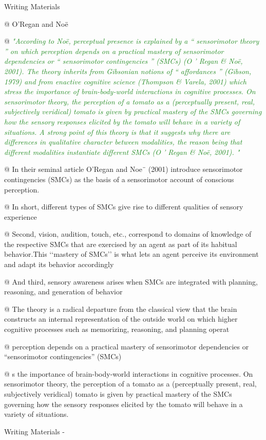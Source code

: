 \documentclass[utf8]{article}
\newenvironment{WritingMaterials} %
    	{
            \begin{tcolorbox}[enhanced,
                title=-,
                size=small,
                colbacktitle=Aquamarine,
                drop fuzzy shadow,
                fontupper=\small,
                boxrule=0.4pt,
                colback=Aquamarine!10!white,
                sharp corners]
                Writing Materials
            \end{tcolorbox}
            \begin{easylist}[itemize]
    	}
    	{
            \end{easylist}  
            \begin{tcolorbox}[enhanced,
                halign=flush right,
                halign title=right,
                size=small,
                colbacktitle=Aquamarine,
                drop fuzzy shadow,
                fontupper=\small,
                boxrule=0.4pt,
                colback=Aquamarine,
                colupper=White,
                sharp corners]
                Writing Materials -
            \end{tcolorbox}        
    	}
\newcommand{\rewrite}[1]{\textcolor{ForestGreen}{\textit{"#1"}}\newline}
\begin{document}
			\begin{WritingMaterials} %

				@ O’Regan and Noë


				@ \rewrite{According to Noë, perceptual presence is explained by a “ sensorimotor theory ” on which perception depends on a practical mastery of sensorimotor dependencies or “ sensorimotor contingencies ” (SMCs) (O ’ Regan & Noë, 2001). The theory inherits from Gibsonian notions of “ affordances ” (Gibson, 1979) and from enactive cognitive science (Thompson & Varela, 2001) which stress the importance of brain-body-world interactions in cognitive processes. On sensorimotor theory, the perception of a tomato as a (perceptually present, real, subjectively veridical) tomato is given by practical mastery of the SMCs governing how the sensory responses elicited by the tomato will behave in a variety of situations. A strong point of this theory is that it suggests why there are differences in qualitative character between modalities, the reason being that different modalities instantiate different SMCs (O ’ Regan & Noë, 2001). }

				@ In their seminal article O’Regan and Noe¨ (2001) introduce sensorimotor contingencies (SMCs) as the basis of a sensorimotor account of conscious perception.

				@ In short, different types of SMCs give rise to different qualities of sensory experience

				@  Second, vision, audition, touch, etc., correspond to domains of knowledge of the respective SMCs that are exercised by an agent as part of its habitual behavior.This ‘‘mastery of SMCs’’ is what lets an agent perceive its environment and adapt its behavior accordingly

				@ And third, sensory awareness arises when SMCs are integrated with planning, reasoning, and generation of behavior

				@ The theory is a radical departure from the classical view that the brain constructs an internal representation of the outside world on which higher cognitive processes such as memorizing, reasoning, and planning operat

				@ perception depends on a practical mastery of sensorimotor dependencies or “sensorimotor contingencies” (SMCs)

				@ s the importance of brain-body-world interactions in cognitive processes. On sensorimotor theory, the perception of a tomato as a (perceptually present, real, subjectively veridical) tomato is given by practical mastery of the SMCs governing how the sensory responses elicited by the tomato will behave in a variety of situations.


\end{WritingMaterials}
\end{document}
